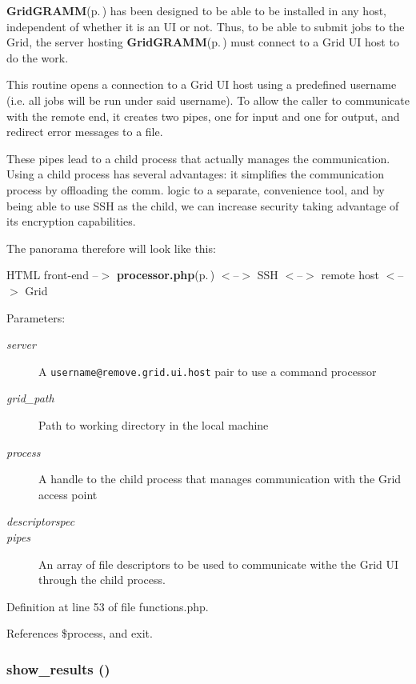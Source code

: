 {\bf Grid\-GRAMM}{\rm (p.\,\pageref{namespaceGridGRAMM})} has been designed to be able to be installed in any host, independent of whether it is an UI or not. Thus, to be able to submit jobs to the Grid, the server hosting {\bf Grid\-GRAMM}{\rm (p.\,\pageref{namespaceGridGRAMM})} must connect to a Grid UI host to do the work.

This routine opens a connection to a Grid UI host using a predefined username (i.e. all jobs will be run under said username). To allow the caller to communicate with the remote end, it creates two pipes, one for input and one for output, and redirect error messages to a file.

These pipes lead to a child process that actually manages the communication. Using a child process has several advantages: it simplifies the communication process by offloading the comm. logic to a separate, convenience tool, and by being able to use SSH as the child, we can increase security taking advantage of its encryption capabilities.

The panorama therefore will look like this:

HTML front-end --$>$ {\bf processor.php}{\rm (p.\,\pageref{processor_8php})} $<$--$>$ SSH $<$--$>$ remote host $<$--$>$ Grid

\begin{Desc}
\item[Parameters:]
\begin{description}
\item[{\em server}]A {\tt username@remove.grid.ui.host} pair to use a command processor \item[{\em grid\_\-path}]Path to working directory in the local machine \item[{\em process}]A handle to the child process that manages communication with the Grid access point \item[{\em descriptorspec}]\item[{\em pipes}]An array of file descriptors to be used to communicate withe the Grid UI through the child process. \end{description}
\end{Desc}


Definition at line 53 of file functions.php.

References \$process, and exit.
\subsubsection{\setlength{\rightskip}{0pt plus 5cm}show\_\-results ()}\label{functions_8php_a11}



